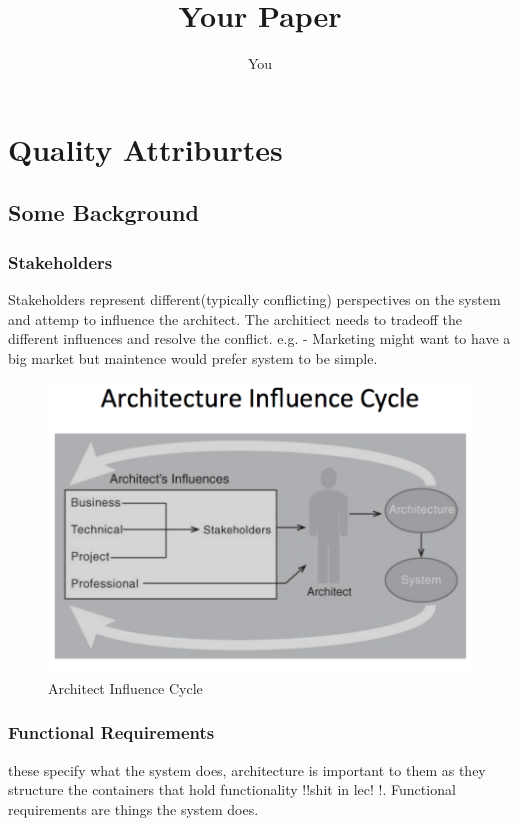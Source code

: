 \documentclass[a4paper]{report}
\title{Your Paper}
\author{You}
\begin{document}
\maketitle
\tableofcontents

\chapter{Quality Attriburtes}
\section{Some Background}
\subsection{Stakeholders}
Stakeholders represent different(typically conflicting) perspectives on the system and attemp to influence the architect. The architiect needs to tradeoff the different influences and resolve the conflict. e.g. -  Marketing might want to have a big market but maintence would prefer system to be simple. 

\begin{figure}[h]
\centering 
\includegraphics[scale=0.3]{aimages/influencecycle.png}
\caption{\label{tab:widgets}Architect Influence Cycle }
\end{figure}

\subsection{Functional Requirements}
these specify what the system does, architecture is important to them as they structure the containers that hold functionality !!shit in lec! !. Functional requirements are things the system does.
\end{document}
